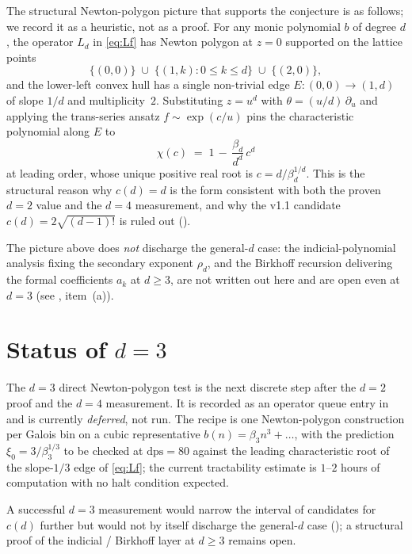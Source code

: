 \documentclass[11pt,reqno]{amsart}
\theoremstyle{plain}
\theoremstyle{definition}
\theoremstyle{remark}
\newcommand{\dps}{\mathrm{dps}}
\begin{document}
The structural Newton-polygon picture that supports the
conjecture is as follows; we record it as a heuristic, not
as a proof. For any monic polynomial $b$ of degree $d$, the
operator $L_d$ in \eqref{eq:Lf} has Newton polygon at
$z = 0$ supported on the lattice points
\[
  \{(0,0)\} \;\cup\; \{(1, k) : 0 \le k \le d\}
            \;\cup\; \{(2, 0)\},
\]
and the lower-left convex hull has a single non-trivial edge
$E:(0,0) \to (1, d)$ of slope $1/d$ and multiplicity~$2$.
Substituting $z = u^d$ with $\theta = (u/d)\,\partial_u$ and
applying the trans-series ansatz $f \sim \exp(c/u)$ pins the
characteristic polynomial along $E$ to
\[
  \chi(c) \;=\; 1 \,-\, \frac{\beta_d}{d^d}\,c^d
\]
at leading order, whose unique positive real root is
$c = d / \beta_d^{1/d}$. This is the structural reason why
$c(d) = d$ is the form consistent with both the proven
$d = 2$ value and the $d = 4$ measurement, and why the v1.1
candidate $c(d) = 2\sqrt{(d-1)!}$ is ruled out
().

The picture above does \emph{not} discharge the general-$d$
case: the indicial-polynomial analysis fixing the secondary
exponent $\rho_d$, and the Birkhoff recursion delivering the
formal coefficients $a_k$ at $d \ge 3$, are not written out
here and are open even at $d = 3$
(see , item~(a)).

\section{Status of \texorpdfstring{$d = 3$}{d=3}}
\label{sec:d3}

The $d = 3$ direct Newton-polygon test is the next discrete
step after the $d = 2$ proof and the $d = 4$ measurement.
It is recorded as an operator queue entry in
\cite[\S9, \textsf{op:xi0-d3-direct}]{siarc_channel_theory_v13}
and is currently \emph{deferred}, not run. The recipe is one
Newton-polygon construction per Galois bin on a cubic
representative $b(n) = \beta_3 n^3 + \dots$, with the
prediction $\xi_0 = 3/\beta_3^{1/3}$ to be checked at
$\dps = 80$ against the leading characteristic root of the
slope-$1/3$ edge of \eqref{eq:Lf}; the current tractability
estimate is $1$--$2$ hours of computation
\cite[\S9]{siarc_channel_theory_v13} with no halt condition
expected.

A successful $d = 3$ measurement would narrow the interval
of candidates for $c(d)$ further but would not by itself
discharge the general-$d$ case
(); a structural proof of the
indicial / Birkhoff layer at $d \ge 3$ remains open.
\end{document}
